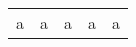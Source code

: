 \begin{table}[t!]
	\centering	
	\begin{tabular}{|p{0.30cm}|p{6.00cm}|p{0.60cm}|p{4.60cm}|p{0.50cm}|}  \hline		
	a&a&a&a&a
	\end{tabular}	
	\label{tab:Example}
\end{table}